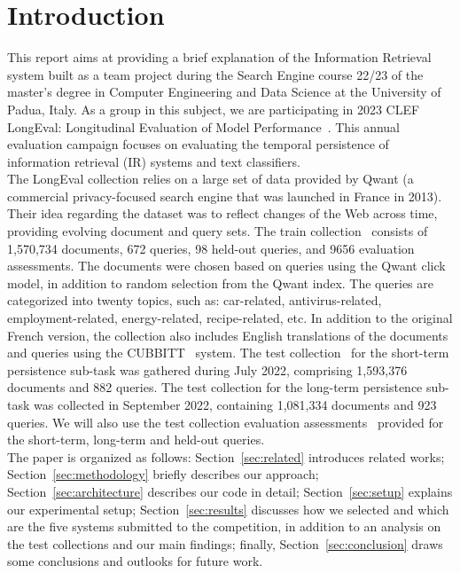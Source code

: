 \section{Introduction}
\label{sec:introduction}

This report aims at providing a brief explanation of the Information Retrieval system built as a team project during the
Search Engine course 22/23 of the master's degree in Computer Engineering and Data Science at the University of Padua,
Italy.
As a group in this subject, we are participating in 2023 CLEF LongEval: Longitudinal Evaluation of Model
Performance~\cite{LongEval}.
This annual evaluation campaign focuses on evaluating the temporal persistence of information retrieval (IR) systems and
text classifiers.\\

The LongEval collection relies on a large set of data provided by Qwant (a commercial privacy-focused
search engine that was launched in France in 2013).
Their idea regarding the dataset was to reflect changes of the Web across time, providing
evolving document and query sets.
The train collection~\cite{traindata} consists of 1,570,734 documents, 672 queries, 98 held-out queries, and 9656
evaluation assessments.
The documents were chosen based on queries using the Qwant click model, in addition to random selection from the Qwant
index.
The queries are categorized into twenty topics, such as: car-related, antivirus-related, employment-related,
energy-related, recipe-related, etc.
In addition to the original French version, the collection also includes English translations of the documents and
queries using the CUBBITT~\cite{CUBBITT} system.
The test collection~\cite{testdata} for the short-term persistence sub-task was gathered during July 2022, comprising
1,593,376 documents and 882 queries.
The test collection for the long-term persistence sub-task was collected in September 2022, containing 1,081,334
documents and 923 queries.
We will also use the test collection evaluation assessments~\cite{test_qrels} provided for the short-term, long-term and
held-out queries.\\

The paper is organized as follows: Section~\ref{sec:related} introduces related works;
Section~\ref{sec:methodology} briefly describes our approach;
Section~\ref{sec:architecture} describes our code in detail;
Section~\ref{sec:setup} explains our experimental setup;
Section~\ref{sec:results} discusses how we selected and which are the five systems submitted to the competition, in
addition to an analysis on the test collections and our main findings;
finally, Section~\ref{sec:conclusion} draws some conclusions and outlooks for future work.